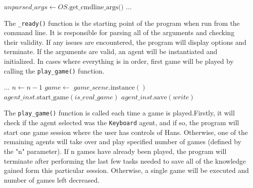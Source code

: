 \begin{algorithm}
\begin{algorithmic}[1]
\State $unparsed\_args \gets OS.\text{get\_cmdline\_args()}$
\State {}
\EndIf
\State $\dots$ 
\State {}
\Else
\State {}
\State {}
\State {}
\State {}
\EndIf
\State {}
\EndIf
\EndFunction
\end{algorithmic}
\end{algorithm}

The \texttt{\_ready()} function is the starting point of the program when run from the command line. It is responsible for parsing all of the arguments and checking their validity. If any issues are encountered, the program will display options and terminate. If the arguments are valid, an agent will be instantiated and initialized. In cases where everything is in order, first game will be played by calling the \texttt{play\_game()} function.

\begin{algorithm}
\begin{algorithmic}[1]
\State $\dots$ 
\State $n \gets n - 1$
\State $game \gets$ $game\_scene.\text{instance}()$
\State {}
\State $agent\_inst.\text{start\_game}(is\_eval\_game)$
\Else
\State $agent\_inst.\text{save}(write)$
\State {}
\EndIf
\EndFunction
\end{algorithmic}
\end{algorithm}

The \texttt{play\_game()} function is called each time a game is played.Firstly, it will check if the agent selected was the \texttt{Keyboard} agent, and if so, the program will start one game session where the user has controls of Hans. Otherwise, one of the remaining agents will take over and play specified number of games (defined by the "n" parameter). If n games have already been played, the program will terminate after performing the last few tasks needed to save all of the knowledge gained form this particular session. Otherwise, a single game will be executed and number of games left decreased.

